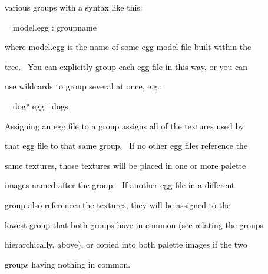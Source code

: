 \documentclass[a4paper]{article}
\newcommand\textstyleOOoComputerKeyWord[1]{\textrm{\textcolor[rgb]{0.0,0.0,0.5019608}{#1}}}
\begin{document}
{\color{black}
\textstyleOOoComputerKeyWord{\textcolor{black}{various groups with a syntax like this:}}}


\bigskip

{\color{black}
\textstyleOOoComputerKeyWord{\textcolor{black}{\ \ model.egg : groupname}}}


\bigskip

{\color{black}
\textstyleOOoComputerKeyWord{\textcolor{black}{where model.egg is the name of some egg model file built within the}}}

{\color{black}
\textstyleOOoComputerKeyWord{\textcolor{black}{tree. \ You can explicitly group each egg file in this way, or you can}}}

{\color{black}
\textstyleOOoComputerKeyWord{\textcolor{black}{use wildcards to group several at once, e.g.:}}}


\bigskip

{\color{black}
\textstyleOOoComputerKeyWord{\textcolor{black}{\ \ dog*.egg : dogs}}}


\bigskip

\clearpage
\bigskip

{\color{black}
\textstyleOOoComputerKeyWord{\textcolor{black}{Assigning an egg file to a group assigns all of the textures used by}}}

{\color{black}
\textstyleOOoComputerKeyWord{\textcolor{black}{that egg file to that same group. \ If no other egg files reference
the}}}

{\color{black}
\textstyleOOoComputerKeyWord{\textcolor{black}{same textures, those textures will be placed in one or more palette}}}

{\color{black}
\textstyleOOoComputerKeyWord{\textcolor{black}{images named after the group. \ If another egg file in a different}}}

{\color{black}
\textstyleOOoComputerKeyWord{\textcolor{black}{group also references the textures, they will be assigned to the}}}

{\color{black}
\textstyleOOoComputerKeyWord{\textcolor{black}{lowest group that both groups have in common (see relating the groups}}}

{\color{black}
\textstyleOOoComputerKeyWord{\textcolor{black}{hierarchically, above), or copied into both palette images if the two}}}

{\color{black}
\textstyleOOoComputerKeyWord{\textcolor{black}{groups having nothing in common.}}}


\bigskip


\bigskip
\end{document}
